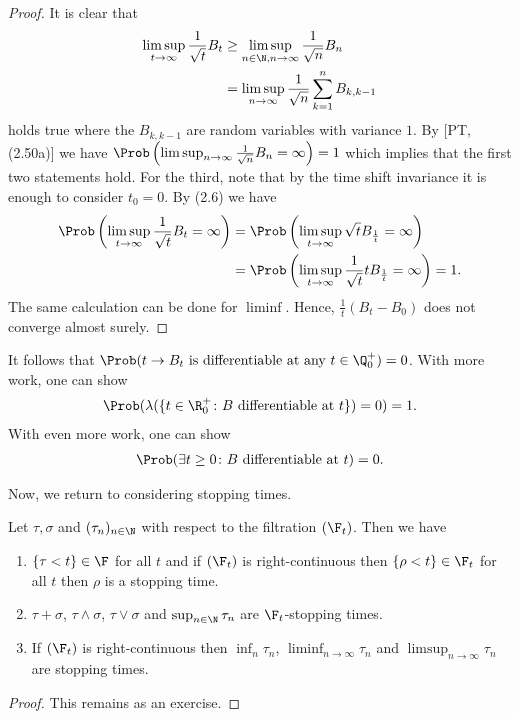 \begin{proof}
It is clear that
\begin{align*}
\limsup_{t \to \infty} \frac{1}{\sqrt{t}} B_t &\geq \limsup_{n \in \N, n\to \infty} \frac{1}{\sqrt{n}}B_n \\
&= \limsup_{n\to \infty} \frac{1}{\sqrt{n}} \sum_{k=1}^n B_{k,k-1}
\end{align*}
holds true where the $B_{k,k-1}$ are \iid random variables with variance $1$.
By [PT, (2.50a)] we have $\Prob\left(\limsup_{n\to \infty} \frac{1}{\sqrt{n}} B_n=\infty\right)=1$ which implies that the first two statements hold.
For the third, note that by the time shift invariance it is enough to consider $t_0=0$.
By (2.6) we have
\begin{align*}
\Prob\left(\limsup_{t \to \infty} \frac{1}{\sqrt{t}}B_t =\infty\right)&=\Prob\left(\limsup_{t \to \infty} \sqrt{t}B_{\frac{1}{t}}=\infty\right)\\
&=\Prob\left(\limsup_{t \to \infty} \frac{1}{\sqrt{t}} t B_{\frac{1}{t}}=\infty\right)=1.
\end{align*}
The same calculation can be done for $\liminf$.
Hence, $\frac{1}{t}(B_t-B_0)$ does not converge almost surely.
\end{proof}

\begin{bem}
It follows that $\Prob(t\to B_t \text{ is differentiable at any } t \in \Q_0^+)=0$.
With more work, one can show
\begin{align*}
\Prob(\lambda(\{t \in \R_0^+ \colon B \text{ differentiable at } t\})=0)=1.
\end{align*}
With even more work, one can show
\begin{align*}
\Prob(\exists t \geq 0 \colon B \text{ differentiable at } t)=0.
\end{align*}
\end{bem}

Now, we return to considering stopping times.

\begin{prop}
Let $\tau, \sigma$ and $(\tau_n)_{n\in \N}$ with respect to the filtration $(\F_t)$. Then we have
\begin{enumerate}[label=\alph*)]
\item $\{\tau <t\} \in \F$ for all $t$ and if $(\F_t)$ is right-continuous then $\{\rho <t\} \in \F_t$ for all $t$ then $\rho$ is a stopping time.
\item $\tau+ \sigma$, $\tau \wedge \sigma$, $\tau \lor \sigma$ and $\sup_{n\in \N} \tau_n$ are $\F_t$-stopping times.
\item If $(\F_t)$ is right-continuous then $\inf_n \tau_n$, $\liminf_{n \to \infty} \tau_n$ and $\limsup_{n \to \infty} \tau_n$ are stopping times.
\end{enumerate}
\end{prop}
\begin{proof}
This remains as an exercise.
\end{proof}

